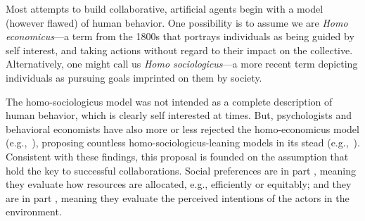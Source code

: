 Most attempts to build collaborative, artificial agents begin with a
model (however flawed) of human behavior.
%
One possibility is to assume we are \emph{Homo economicus}---a term
from the 1800s that portrays individuals as being guided by self interest,
and taking actions without regard to their impact on the collective.
Alternatively, one might call us \emph{Homo
  sociologicus}---a more recent term depicting individuals as pursuing
goals imprinted on them by society.

The homo-sociologicus model was not intended as a complete description
of human behavior, which is clearly self interested at times.  But,
psychologists and behavioral economists have also more or less
rejected the homo-economicus model (e.g.,~\cite{kahnemanst82}),
proposing countless homo-sociologicus-leaning models in its
stead (e.g.,~\cite{blanco11,falk2003nature,fehr1999theory,fehr2006economics,fisman07,forsythe94,kahneman86}).
%
Consistent with these findings, this proposal is founded on the
assumption that 
 hold the key to successful collaborations.
%
Social preferences are in part , meaning they
evaluate how resources are allocated, e.g., efficiently or equitably;
and they are in part , meaning they evaluate the
perceived intentions of the actors in the environment.


